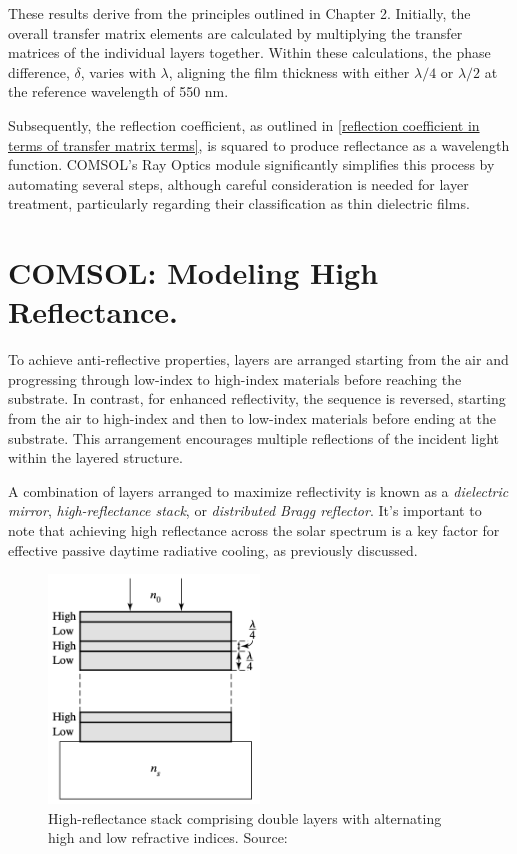 These results derive from the principles outlined in Chapter 2. Initially, the overall transfer matrix elements are calculated by multiplying the transfer matrices of the individual layers together. Within these calculations, the phase difference, $\delta$, varies with $\lambda$, aligning the film thickness with either $\lambda/4$ or $\lambda/2$ at the reference wavelength of 550 nm.

Subsequently, the reflection coefficient, as outlined in \ref{reflection coefficient in terms of transfer matrix terms}, is squared to produce reflectance as a wavelength function. COMSOL's Ray Optics module significantly simplifies this process by automating several steps, although careful consideration is needed for layer treatment, particularly regarding their classification as thin dielectric films.

\section{COMSOL: Modeling High Reflectance.}
To achieve anti-reflective properties, layers are arranged starting from the air and progressing through low-index to high-index materials before reaching the substrate. In contrast, for enhanced reflectivity, the sequence is reversed, starting from the air to high-index and then to low-index materials before ending at the substrate. This arrangement encourages multiple reflections of the incident light within the layered structure.

A combination of layers arranged to maximize reflectivity is known as a \emph{dielectric mirror}, \emph{high-reflectance stack}, or \emph{distributed Bragg reflector}. It's important to note that achieving high reflectance across the solar spectrum is a key factor for effective passive daytime radiative cooling, as previously discussed.

\begin{figure}[H]
  \centering
  \includegraphics[width=0.5\textwidth]{Chapters/Figures/Chapter 4 Figures/High-Reflectance Stack of Double Layers.png}
  \caption{High-reflectance stack comprising double layers with alternating high and low refractive indices. Source: \cite{pedrotti_introduction_2007}}
  \label{fig:visualizing high-reflectance stack with alternating indices}
\end{figure}

